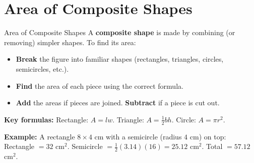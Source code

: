 \section{Area of Composite Shapes}

\begin{quickReview}{Area of Composite Shapes}
A \textbf{composite shape} is made by combining (or removing) simpler shapes. To find its area:

\begin{itemize}[leftmargin=*]
    \item \textbf{Break} the figure into familiar shapes (rectangles, triangles, circles, semicircles, etc.).
    \item \textbf{Find} the area of each piece using the correct formula.
    \item \textbf{Add} the areas if pieces are joined. \textbf{Subtract} if a piece is cut out.
\end{itemize}

\medskip
\textbf{Key formulas:} Rectangle: $A = lw$. \quad Triangle: $A = \frac{1}{2}bh$. \quad Circle: $A = \pi r^2$.

\smallskip
\textbf{Example:} A rectangle $8 \times 4$ cm with a semicircle (radius $4$ cm) on top:
Rectangle $= 32$ cm$^2$. Semicircle $= \frac{1}{2}(3.14)(16) = 25.12$ cm$^2$. Total $= 57.12$ cm$^2$.
\end{quickReview}

